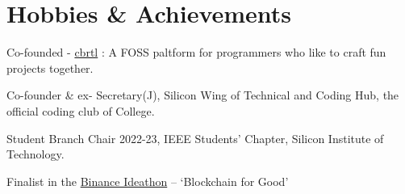 \documentclass[]{assets/deedy-resume-openfont}
\begin{document}
\section{Hobbies \& Achievements}
\begin{tightemize}  
    \item Co-founded - \href{https://cbrtl.github.io}{cbrtl} : A FOSS paltform for programmers who like to craft fun projects together.\\
    \item Co-founder \& ex- Secretary(J), Silicon Wing of Technical and Coding Hub, the official coding club of College.\\
    \item Student Branch Chair 2022-23, IEEE Students’ Chapter, Silicon Institute of Technology.\\
    \item Finalist in the \href{https://www.binance.com/en-IN/support/announcement/7ccec2ff0fd0429b8efdddcff962ff64}{Binance Ideathon} – ‘Blockchain for Good’\\
\end{tightemize}
     \ 
     
\end{document}
